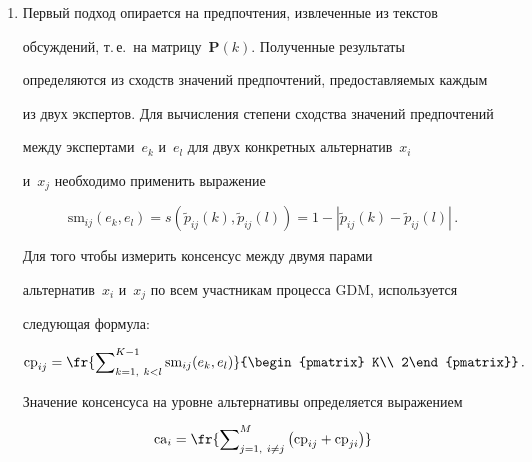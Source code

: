   \begin{enumerate}[1.]


  \item Первый подход опирается на предпочтения, извлеченные из текстов 


обсуждений, т.\,е.\ на матрицу~$\mathbf{P}(k)$. Полученные результаты 


определяются из сходств значений предпочтений, предоставляемых каждым 


из двух экспертов. Для вычисления степени сходства значений предпочтений 


между экспертами~$e_k$ и~$e_l$ для двух конкретных альтернатив~$x_i$ 


и~$x_j$ необходимо применить выражение


  \begin{equation*}


  \mathrm{sm}_{ij}\left( e_k, e_l\right) =s\left( \tilde{p}_{ij}(k), \tilde{p}_{ij}(l)\right) =1-


\left\vert \tilde{p}_{ij}(k)-\tilde{p}_{ij}(l)\right\vert \,.




  \end{equation*}


  


  Для того чтобы измерить консенсус между двумя парами 


альтернатив~$x_i$ и~$x_j$ по всем участникам процесса GDM, используется 


следующая формула:


  \begin{equation*}


  \mathrm{cp}_{ij} =\fr{\sum\nolimits^{K-1}_{k=1,\ k<l} \mathrm{sm}_{ij} (e_k, e_l)} 


{\begin{pmatrix} K\\ 2\end{pmatrix}}\,.




  \end{equation*}


  


  Значение консенсуса на уровне альтернативы определяется выражением


  \begin{equation*}


  \mathrm{ca}_i=\fr{\sum\nolimits^M_{j=1,\ i\not=j} \left( \mathrm{cp}_{ij}+\mathrm{cp}_{ji}\right)}  



\end{equation*}
\end{enumerate}
